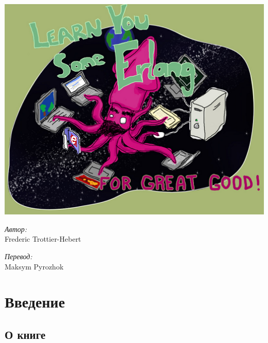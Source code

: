\documentclass[a4paper,12pt]{report}
\begin{document}
\begin{titlepage}
    \begin{center}
        \includegraphics[width=1\textwidth]{title.png}
        \\[5cm]
        \begin{minipage}{0.4\textwidth}
            \begin{flushleft}
                \emph{Автор:}\large\\
                 Frederic Trottier-Hebert
            \end{flushleft}
        \end{minipage}
        \begin{minipage}{0.4\textwidth}
            \begin{flushright}
                \emph{Перевод:}\\
                Maksym Pyrozhok
            \end{flushright}
        \end{minipage}
        \vfill
    \end{center}
\end{titlepage}

\chapter{Введение}

\section{О книге}
\end{document}
